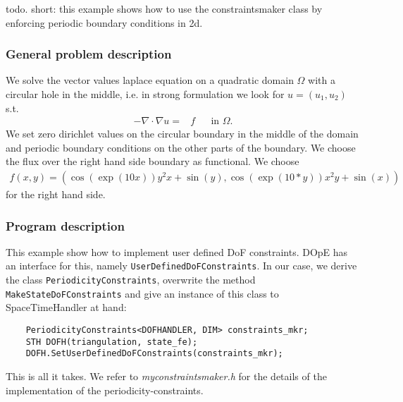 todo. short: this example shows how to use the constraintsmaker class by enforcing periodic boundary conditions in 2d.

\subsubsection{General problem description}
We solve the vector values laplace equation on a quadratic domain $\Omega$ with a circular hole in the middle, i.e. in strong formulation we look for $u=(u_1,u_2)$ s.t.
\begin{align*}
-\nabla \cdot \nabla u =& f &&\text{in }\Omega.
\end{align*}
We set zero dirichlet values on the circular boundary in the middle of the domain and periodic boundary conditions on the other parts of the boundary. We choose the flux over the right hand side boundary as functional. We choose
\begin{align*}
f(x,y) = \left(\cos\left(\exp(10  x)\right)  y^2x + \sin(y), \cos\left(\exp(10 * y)\right)x^2y + \sin(x)\right)
\end{align*}
for the right hand side.
\subsubsection{Program description}
This example show how to implement user defined DoF constraints. DOpE has an interface for this, namely \texttt{UserDefinedDoFConstraints}. In our case, we derive the class \texttt{PeriodicityConstraints}, overwrite the method \texttt{MakeStateDoFConstraints} and give an instance of this class to SpaceTimeHandler at hand:
\begin{verbatim}
 	PeriodicityConstraints<DOFHANDLER, DIM> constraints_mkr;
 	STH DOFH(triangulation, state_fe);
 	DOFH.SetUserDefinedDoFConstraints(constraints_mkr);
\end{verbatim}
This is all it takes. We refer to \textit{myconstraintsmaker.h} for the details of the implementation of the periodicity-constraints.
